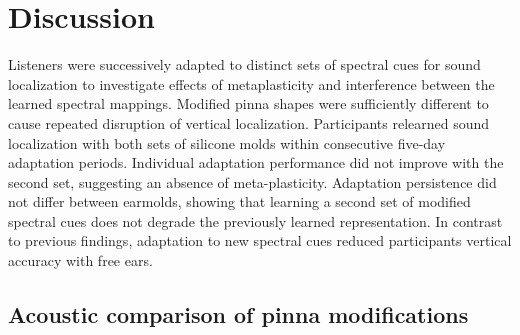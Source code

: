 \section{Discussion}\label{sec1}%

Listeners were successively adapted to distinct sets of spectral cues for sound localization to investigate effects of metaplasticity and interference between the learned spectral mappings. Modified pinna shapes were sufficiently different to cause repeated disruption of vertical localization. Participants relearned sound localization with both sets of silicone molds within consecutive five-day adaptation periods. Individual adaptation performance did not improve with the second set, suggesting an absence of meta-plasticity. Adaptation persistence did not differ between earmolds, showing that learning a second set of modified spectral cues does not degrade the previously learned representation. In contrast to previous findings, adaptation to new spectral cues reduced participants vertical accuracy with free ears.

\subsection{Acoustic comparison of pinna modifications}

